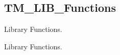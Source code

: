 \hypertarget{group___t_m___l_i_b___functions}{}\subsection{T\+M\+\_\+\+L\+I\+B\+\_\+\+Functions}
\label{group___t_m___l_i_b___functions}


Library Functions.  


Library Functions. 

